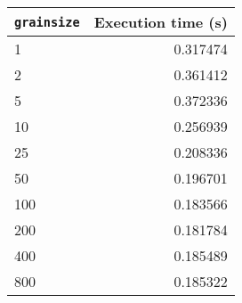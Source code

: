 \begin{tabular}{lr}
\toprule
\texttt{grainsize} &  Execution time (s) \\
\midrule
1         &  0.317474 \\
2         &  0.361412 \\
5         &  0.372336 \\
10        &  0.256939 \\
25        &  0.208336 \\
50        &  0.196701 \\
100       &  0.183566 \\
200       &  0.181784 \\
400       &  0.185489 \\
800       &  0.185322 \\
\bottomrule
\end{tabular}
